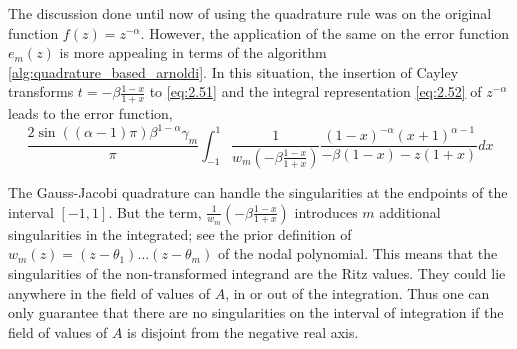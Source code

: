 The discussion done until now of using the quadrature rule was on the original function $f(z)=z^{-\alpha}$. However, the application of the same on the error function $e_{m}(z)$ is more appealing in terms of the algorithm \ref{alg:quadrature_based_arnoldi}. In this situation, the insertion of Cayley transforms $t= -\beta \frac{1-x}{1+x}$ to \ref{eq:2.51} and the integral representation \ref{eq:2.52} of $z^{-\alpha}$ leads to the error function,
\begin{equation}
    \frac{2 \sin((\alpha - 1)\pi) \beta^{1 - \alpha} \gamma_{m}}{\pi} \int_{-1}^{1} \frac{1}{w_{m}\left( -\beta \frac{1 - x}{1 + x} \right)}\frac{(1 - x)^{-\alpha} (x + 1)^{\alpha - 1}}{- \beta (1 - x) - z(1 + x)}dx
    \label{eq:2.56}
\end{equation}

The Gauss-Jacobi quadrature can handle the singularities at the endpoints of the interval $[-1,1]$. But the term, $\frac{1}{w_{m}}(-\beta\frac{1-x}{1+x})$ introduces $m$ additional singularities in the integrated; see the prior definition of $w_{m}(z)=(z-\theta_{1})\dots(z-\theta_{m})$ of the nodal polynomial. This means that the singularities of the non-transformed integrand are the Ritz values. They could lie anywhere in the field of values of $A$, in or out of the integration. Thus one can only guarantee that there are no singularities on the interval of integration if the field of values of $A$ is disjoint from the negative real axis.